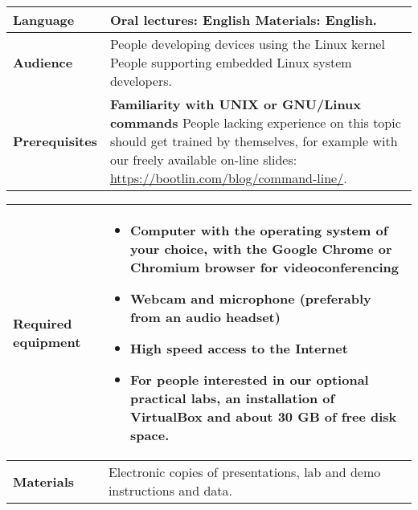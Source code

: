 \documentclass[a4paper,12pt,obeyspaces,spaces,hyphens]{article}
\begin{document}
{\begin{tabularx}{\textwidth}{|g|h|}
    {\bf Language} & Oral lectures: English
    \newline Materials: English.\\
    \hline

    {\bf Audience} & People developing devices using the Linux kernel
    \newline People supporting embedded Linux system developers. \\
    \hline

    {\bf Prerequisites} &
    {\bf Familiarity with UNIX or GNU/Linux commands}
    \newline People lacking experience on this topic should get
    trained by themselves, for example with our freely available
    on-line slides:
    \newline \url{https://bootlin.com/blog/command-line/}. \\
    \hline

  \end{tabularx}

  \begin{tabularx}{\textwidth}{|g|h|}
    {\bf Required equipment} &
    \begin{itemize}
    \item Computer with the operating system of your choice, with the
          Google Chrome or Chromium browser for videoconferencing
    \item Webcam and microphone (preferably from an audio headset)
    \item High speed access to the Internet
    \item For people interested in our optional practical labs,
          an installation of VirtualBox and about 30 GB of free
          disk space.
    \end{itemize}\\
    \hline

    {\bf Materials} & Electronic copies of presentations,
    lab and demo instructions and data.\\
    \hline

\end{tabularx}}
\normalsize
\end{document}
